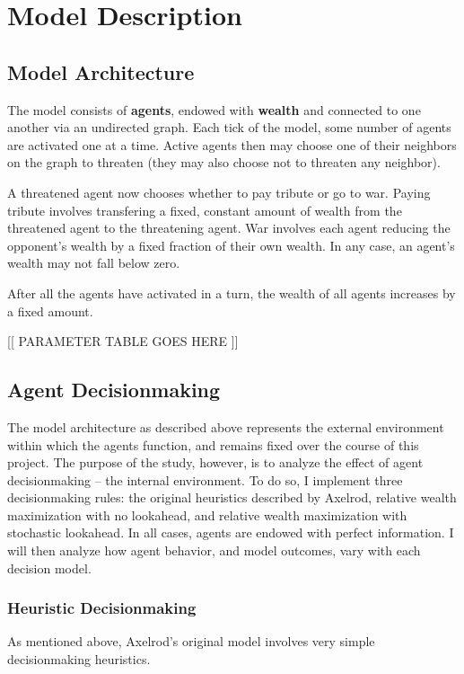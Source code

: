 \documentclass{article}
\begin{document}
\section{Model Description}

\subsection{Model Architecture}

The model consists of \textbf{agents}, endowed with \textbf{wealth} and connected to one another via an undirected graph. Each tick of the model, some number of agents are activated one at a time. Active agents then may choose one of their neighbors on the graph to threaten (they may also choose not to threaten any neighbor). 

A threatened agent now chooses whether to pay tribute or go to war. Paying tribute involves transfering a fixed, constant amount of wealth from the threatened agent to the threatening agent. War involves each agent reducing the opponent's wealth by a fixed fraction of their own wealth. In any case, an agent's wealth may not fall below zero.

After all the agents have activated in a turn, the wealth of all agents increases by a fixed amount.

[[ PARAMETER TABLE GOES HERE ]]

\subsection{Agent Decisionmaking}
The model architecture as described above represents the external environment within which the agents function, and remains fixed over the course of this project. The purpose of the study, however, is to analyze the effect of agent decisionmaking -- the internal environment. To do so, I implement three decisionmaking rules: the original heuristics described by Axelrod, relative wealth maximization with no lookahead, and relative wealth maximization with stochastic lookahead. In all cases, agents are endowed with perfect information.  I will then analyze how agent behavior, and model outcomes, vary with each decision model.

\subsubsection{Heuristic Decisionmaking}

As mentioned above, Axelrod's original model involves very simple decisionmaking heuristics.
\end{document}
